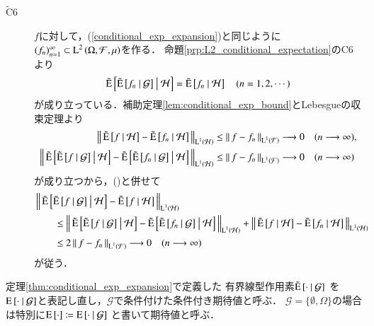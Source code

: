 \begin{prf}
\begin{description}
			\item[$\tilde{\mathrm{C}}$6]
				$f$に対して，(\ref{conditional_exp_expansion})と同じように$(f_n)_{n=1}^{\infty} \subset \Lp{2}{\Omega,\mathcal{F},\mu}$を作る．
				命題\ref{prp:L2_conditional_expectation}のC6より
				\begin{align}
					\tcexp{\tcexp{f_n}{\mathcal{G}}}{\mathcal{H}} = \tcexp{f_n}{\mathcal{H}}
					\quad (n=1,2,\cdots)
					\label{eq:conditional_exp_L1_2}
				\end{align}
				が成り立っている．補助定理\ref{lem:conditional_exp_bound}とLebesgueの収束定理より
				\begin{align}
					\Norm{ \tcexp{f}{\mathcal{H}} -  \tcexp{f_n}{\mathcal{H}}}{\Lp{1}{\mathcal{H}}}
					&\leq \Norm{f -  f_n}{\Lp{1}{\mathcal{F}}}
					\longrightarrow 0 \quad (n \longrightarrow \infty), \\
					\Norm{ \tcexp{\tcexp{f}{\mathcal{G}}}{\mathcal{H}} -  \tcexp{\tcexp{f_n}{\mathcal{G}}}{\mathcal{H}}}{\Lp{1}{\mathcal{H}}}
					&\leq \Norm{f -  f_n}{\Lp{1}{\mathcal{F}}}
					\longrightarrow 0 \quad (n \longrightarrow \infty)
				\end{align}
				が成り立つから，()と併せて
				\begin{align}
					&\Norm{ \tcexp{\tcexp{f}{\mathcal{G}}}{\mathcal{H}} - \tcexp{f}{\mathcal{H}} }{\Lp{1}{\mathcal{H}}} \\
					&\qquad\leq \Norm{ \tcexp{\tcexp{f}{\mathcal{G}}}{\mathcal{H}} -  \tcexp{\tcexp{f_n}{\mathcal{G}}}{\mathcal{H}}}{\Lp{1}{\mathcal{H}}}
						+ \Norm{ \tcexp{f}{\mathcal{H}} -  \tcexp{f_n}{\mathcal{H}}}{\Lp{1}{\mathcal{H}}} \\
					&\qquad \leq 2 \Norm{f -  f_n}{\Lp{1}{\mathcal{F}}} \longrightarrow 0 \quad (n \longrightarrow \infty)
				\end{align}
				が従う．
				\QED
		\end{description}
	\end{prf}
	
	\begin{screen}
		\begin{dfn}[条件付き期待値の再定義]
			定理\ref{thm:conditional_exp_expansion}で定義した
			有界線型作用素$\tcexp{\cdot}{\mathcal{G}}$
			を$\cexp{\cdot}{\mathcal{G}}$と表記し直し，$\mathcal{G}$で条件付けた条件付き期待値と呼ぶ．
			$\mathcal{G} = \{\emptyset, \Omega\}$の場合は特別に$\Exp{\cdot} \coloneqq \cexp{\cdot}{\mathcal{G}}$
			と書いて期待値と呼ぶ．
		\end{dfn}
	\end{screen}